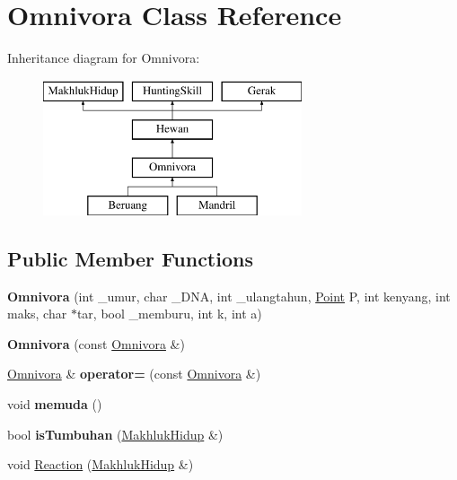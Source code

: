 \hypertarget{class_omnivora}{}\section{Omnivora Class Reference}
\label{class_omnivora}
Inheritance diagram for Omnivora\+:\begin{figure}[H]
\begin{center}
\leavevmode
\includegraphics[height=4.000000cm]{class_omnivora}
\end{center}
\end{figure}
\subsection*{Public Member Functions}
\begin{DoxyCompactItemize}
\item 
{\bfseries Omnivora} (int \+\_\+umur, char \+\_\+\+D\+NA, int \+\_\+ulangtahun, \hyperlink{class_point}{Point} P, int kenyang, int maks, char $\ast$tar, bool \+\_\+memburu, int k, int a)\hypertarget{class_omnivora_a1fb1d0e6f790f45af95f9887b20e24ad}{}\label{class_omnivora_a1fb1d0e6f790f45af95f9887b20e24ad}

\item 
{\bfseries Omnivora} (const \hyperlink{class_omnivora}{Omnivora} \&)\hypertarget{class_omnivora_afb44343570d732d361bfc7630da078c7}{}\label{class_omnivora_afb44343570d732d361bfc7630da078c7}

\item 
\hyperlink{class_omnivora}{Omnivora} \& {\bfseries operator=} (const \hyperlink{class_omnivora}{Omnivora} \&)\hypertarget{class_omnivora_a5e805170a3e3bd6ab15763229e58eb63}{}\label{class_omnivora_a5e805170a3e3bd6ab15763229e58eb63}

\item 
void {\bfseries memuda} ()\hypertarget{class_omnivora_a73ce54c452342971c4e1208ece7900b9}{}\label{class_omnivora_a73ce54c452342971c4e1208ece7900b9}

\item 
bool {\bfseries is\+Tumbuhan} (\hyperlink{class_makhluk_hidup}{Makhluk\+Hidup} \&)\hypertarget{class_omnivora_a2e63b0beba365ec5e3ec79975fe1204c}{}\label{class_omnivora_a2e63b0beba365ec5e3ec79975fe1204c}

\item 
void \hyperlink{class_omnivora_a1b8937b59e4606e6088add7c10bf3f60}{Reaction} (\hyperlink{class_makhluk_hidup}{Makhluk\+Hidup} \&)
\end{DoxyCompactItemize}


